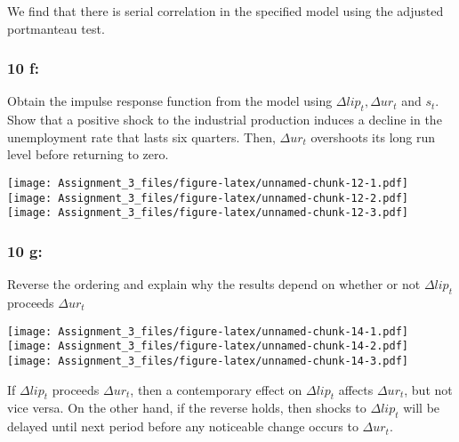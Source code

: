 \documentclass[]{article}
\begin{document}
We find that there is serial correlation in the specified model using
the adjusted portmanteau test.

\subsubsection{10 f:}\label{f}

Obtain the impulse response function from the model using
\(\Delta lip_t, \Delta ur_t\) and \(s_t\). Show that a positive shock to
the industrial production induces a decline in the unemployment rate
that lasts six quarters. Then, \(\Delta ur_t\) overshoots its long run
level before returning to zero.

\texttt{[image: Assignment\_3\_files/figure-latex/unnamed-chunk-12-1.pdf]}
\texttt{[image: Assignment\_3\_files/figure-latex/unnamed-chunk-12-2.pdf]}
\texttt{[image: Assignment\_3\_files/figure-latex/unnamed-chunk-12-3.pdf]}

\subsubsection{10 g:}\label{g}

Reverse the ordering and explain why the results depend on whether or
not \(\Delta lip_t\) proceeds \(\Delta ur_t\)

\texttt{[image: Assignment\_3\_files/figure-latex/unnamed-chunk-14-1.pdf]}
\texttt{[image: Assignment\_3\_files/figure-latex/unnamed-chunk-14-2.pdf]}
\texttt{[image: Assignment\_3\_files/figure-latex/unnamed-chunk-14-3.pdf]}

If \(\Delta lip_t\) proceeds \(\Delta ur_t\), then a contemporary effect
on \(\Delta lip_t\) affects \(\Delta ur_t\), but not vice versa. On the
other hand, if the reverse holds, then shocks to \(\Delta lip_t\) will
be delayed until next period before any noticeable change occurs to
\(\Delta ur_t\).
\end{document}
